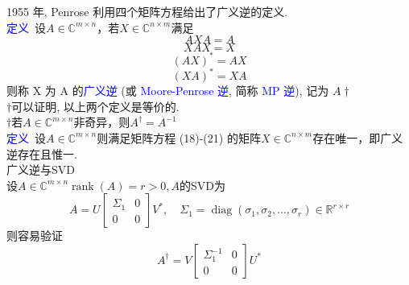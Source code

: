 \documentclass[12pt,a4paper]{article}
\begin{document}
1955 年, Penrose 利用四个矩阵方程给出了广义逆的定义.\\

\textcolor{blue}{定义}~设$A \in \mathbb{C}^{m \times n}$，若$X \in \mathbb{C}^{n \times m}$满足
\begin{equation}
AXA=A 
\end{equation} 
\begin{equation}
XAX=X
\end{equation}
\begin{equation}
(AX)^*=AX
\end{equation}
\begin{equation}
(X A)^{*}=X A 
\end{equation}
则称 X 为 A 的\textcolor{blue}{广义逆} (或 \textcolor{blue}{Moore-Penrose 逆}, 简称 \textcolor{blue}{MP 逆}), 记为 $A\dagger$\\

$\dagger$可以证明, 以上两个定义是等价的.\\

$\dagger$若$A \in \mathbb{C}^{m \times n}$非奇异，则$A^{\dagger}=A^{-1}$\\

\textcolor{blue}{定义}~设$A \in \mathbb{C}^{m \times n}$则满足矩阵方程 (18)-(21) 的矩阵$X \in \mathbb{C}^{n \times m}$存在唯一，即广义逆存在且惟一.\\

广义逆与SVD\\
设$A \in \mathbb{C}^{m \times n}\operatorname{rank}(A)=r>0, A$的SVD为
$$
A=U\left[\begin{array}{cc}{\Sigma_{1}} & {0} \\ {0} & {0}\end{array}\right] V^{*}, \quad \Sigma_{1}=\operatorname{diag}\left(\sigma_{1}, \sigma_{2}, \ldots, \sigma_{r}\right) \in \mathbb{R}^{r \times r}
$$
则容易验证
$$
A^{\dagger}=V\left[\begin{array}{cc}{\Sigma_{1}^{-1}} & {0} \\ {0} & {0}\end{array}\right] U^{*}
$$
\end{document}
